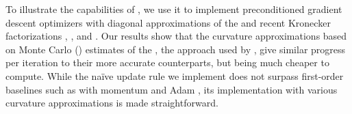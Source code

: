 

To illustrate the capabilities of \BackPACK, we use it to implement
preconditioned gradient descent optimizers with diagonal approximations of the
\GGN and recent Kronecker factorizations \KFAC \citep{martens2015optimizing},
\KFLR, and \KFRA \citep{botev2017practical}. Our results show that the curvature
approximations based on Monte Carlo (\MC) estimates of the \GGN, the approach
used by \KFAC, give similar progress per iteration to their more accurate
counterparts, but being much cheaper to compute. While the naïve update rule we
implement does not surpass first-order baselines such as \SGD with momentum and
Adam \citep{kingma2015adam}, its implementation with various curvature
approximations is made straightforward.

